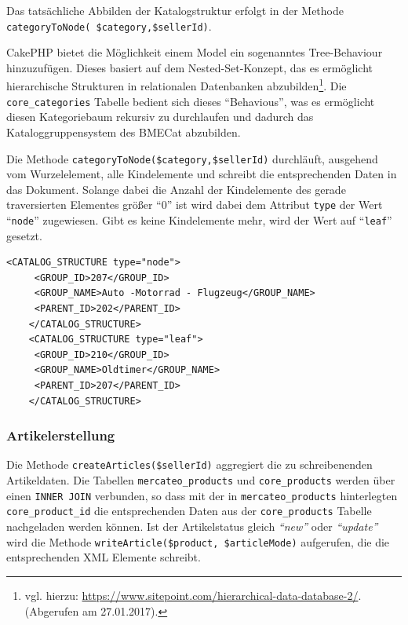 {	 Das tatsächliche Abbilden der Katalogstruktur erfolgt in der Methode \texttt{categoryToNode(\ \$category,\$sellerId)}.


		 CakePHP bietet die Möglichkeit einem Model ein sogenanntes Tree-Behaviour hinzuzufügen. Dieses basiert auf dem Nested-Set-Konzept, das es ermöglicht hierarchische Strukturen in relationalen Datenbanken abzubilden\footnote{vgl. hierzu: \url{https://www.sitepoint.com/hierarchical-data-database-2/}.(Abgerufen am 27.01.2017).}. Die \texttt{core\_categories} Tabelle bedient sich dieses \enquote{Behavious}, was es ermöglicht diesen Kategoriebaum rekursiv zu durchlaufen und dadurch das Kataloggruppensystem des BMECat abzubilden.

	
	
	Die Methode \texttt{categoryToNode(\$category,\$sellerId)} durchläuft, ausgehend vom Wurzelelement, alle Kindelemente und schreibt die entsprechenden Daten in das Dokument. Solange dabei die Anzahl der Kindelemente des gerade traversierten Elementes größer \enquote{0} ist wird dabei dem Attribut \texttt{type} der Wert \enquote{\texttt{node}} zugewiesen. Gibt es keine Kindelemente mehr, wird der Wert auf \enquote{\texttt{leaf}} gesetzt. 
	\lstset{language=xml}
	\begin{lstlisting}[caption={Abbildung des Kataloggruppensystems}]
	<CATALOG_STRUCTURE type="node">
	 <GROUP_ID>207</GROUP_ID>
	 <GROUP_NAME>Auto -Motorrad - Flugzeug</GROUP_NAME>
	 <PARENT_ID>202</PARENT_ID>
	</CATALOG_STRUCTURE>
	<CATALOG_STRUCTURE type="leaf">
	 <GROUP_ID>210</GROUP_ID>
	 <GROUP_NAME>Oldtimer</GROUP_NAME>
	 <PARENT_ID>207</PARENT_ID>
	</CATALOG_STRUCTURE>
	\end{lstlisting}
	
	\subsubsection{Artikelerstellung}
	
	Die Methode \texttt{createArticles(\$sellerId)} aggregiert die zu schreibenenden Artikeldaten. Die Tabellen \texttt{mercateo\_products} und \texttt{core\_products} werden über einen \texttt{INNER JOIN} verbunden, so dass mit der in \texttt{mercateo\_products} hinterlegten \texttt{core\_product\_id} die entsprechenden Daten aus der \texttt{core\_products} Tabelle nachgeladen werden können. 
	Ist der Artikelstatus gleich \textit{\enquote{new}} oder \textit{\enquote{update}} wird die Methode \texttt{writeArticle(\$product, \$articleMode)} aufgerufen, die die entsprechenden XML Elemente schreibt. \\
		
}
